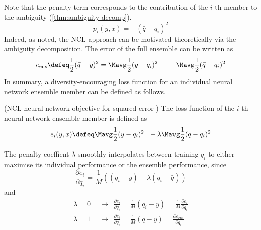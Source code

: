 \documentclass[../main.tex]{subfiles}
\begin{document}
Note that the penalty term corresponds to the contribution of the $i$-th member to the ambiguity (\ref{thm:ambiguity-decomp}).
$$
p_{i}(y,x) = - \left(\bar{q} - q_i\right)^2
$$
Indeed, as \cite{brown2005} noted, the NCL approach can be motivated theoretically via the ambiguity decomposition. The error of the full ensemble can be written as 
$$
e_{\text{ens}} \defeq \frac{1}{2} (\bar{q}-y)^2 = \Mavg \frac{1}{2}(y - q_{i})^2 ~ ~ - ~ ~ \Mavg \frac{1}{2}(\bar{q} - q_{i})^2
$$
In summary, a diversity-encouraging loss function for an individual neural network ensemble member can be defined as follows.
\begin{definition} (NCL neural network objective for squared error \cite{brown2005}) The loss function of the $i$-th neural network ensemble member is defined as
$$
e_{i}(y,x) \defeq \Mavg \frac{1}{2} (y - q_i)^2 ~ ~ - \lambda \Mavg \frac{1}{2} (\bar{q} - q_i)^2
$$
\end{definition}
The penalty coeffient $\lambda$ smoothly interpolates between training $q_{i}$ to either maximise its individual performance or the ensemble performance, since
$$
\frac{\partial e_{i}}{\partial q_{i}} = \frac{1}{M}
\left(
(q_{i}-y) - \lambda (q_{i} - \bar{q})
\right)
$$
and
$$
\begin{align}
\lambda = 0 ~~&\rightarrow~~ \frac{\partial e_{i}}{\partial q_{i}} = \frac{1}{M}(q_{i}-y) = \frac{1}{M} \frac{\partial e_{i}}{\partial q_{i}} \\
\lambda = 1 ~~&\rightarrow~~ \frac{\partial e_{i}}{\partial q_{i}} = \frac{1}{M}(\bar{q} - y) = \frac{\partial e_{\text{ens}}}{\partial q_{i}}
\end{align}
$$
\end{document}
